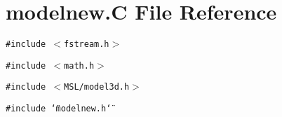 \section{modelnew.C File Reference}
\label{modelnew_C}
{\tt \#include $<$fstream.h$>$}\par
{\tt \#include $<$math.h$>$}\par
{\tt \#include $<$MSL/model3d.h$>$}\par
{\tt \#include \char`\"{}modelnew.h\char`\"{}}\par
